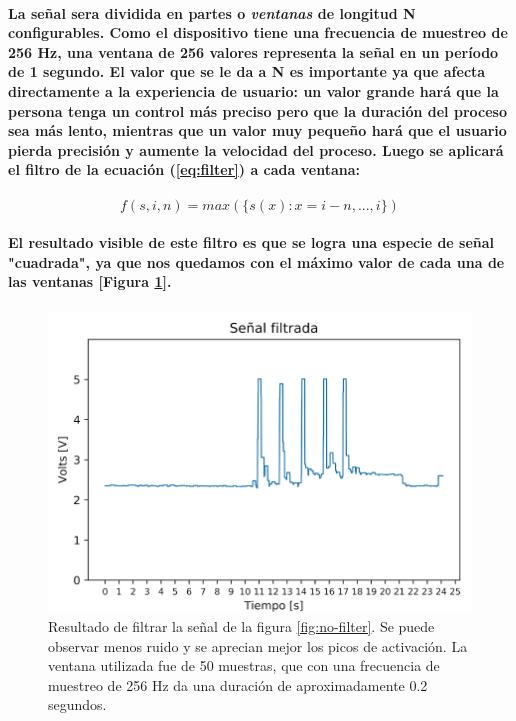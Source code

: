 \documentclass{article}
\begin{document}
\paragraph{
La señal sera dividida en partes o \textit{ventanas} de longitud N configurables. Como el dispositivo tiene una frecuencia de muestreo de 256 Hz, una ventana de 256 valores representa la señal en un período de 1 segundo. El valor que se le da a N es importante ya que afecta directamente a la experiencia de usuario: un valor grande hará que la persona tenga un control más preciso pero que la duración del proceso sea más lento, mientras que un valor muy pequeño hará que el usuario pierda precisión y aumente la velocidad del proceso. Luego se aplicará el filtro de la ecuación (\ref{eq:filter}) a cada ventana:
}

\begin{equation}\label{eq:filter}
f(s, i, n) = max(\big\{ s(x) : x = i - n, ..., i\big\})
\end{equation}

\paragraph{
El resultado visible de este filtro es que se logra una especie de señal "cuadrada", ya que nos quedamos con el máximo valor de cada una de las ventanas [Figura \ref{fig:filtered}].
}

\begin{figure}[ht]
    \centering
    \includegraphics[width=\textwidth]{filtered.png}%
    \caption{Resultado de filtrar la señal de la figura \ref{fig:no-filter}. Se puede observar menos ruido y se aprecian mejor los picos de activación. La ventana utilizada fue de 50 muestras, que con una frecuencia de muestreo de 256 Hz da una duración de aproximadamente 0.2 segundos.}
    \label{fig:filtered}
\end{figure}
\end{document}
